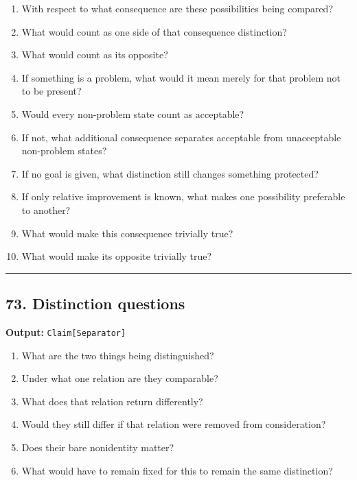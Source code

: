 \documentclass[
]{article}
\providecommand{\tightlist}{%
  \setlength{\itemsep}{0pt}\setlength{\parskip}{0pt}}
\begin{document}
\begin{enumerate}
\def\labelenumi{\arabic{enumi}.}
\tightlist
\item
  With respect to what consequence are these possibilities being
  compared?
\item
  What would count as one side of that consequence distinction?
\item
  What would count as its opposite?
\item
  If something is a problem, what would it mean merely for that problem
  not to be present?
\item
  Would every non-problem state count as acceptable?
\item
  If not, what additional consequence separates acceptable from
  unacceptable non-problem states?
\item
  If no goal is given, what distinction still changes something
  protected?
\item
  If only relative improvement is known, what makes one possibility
  preferable to another?
\item
  What would make this consequence trivially true?
\item
  What would make its opposite trivially true?
\end{enumerate}

\begin{center}\rule{0.5\linewidth}{0.5pt}\end{center}

\subsection{73. Distinction questions}\label{distinction-questions}

\textbf{Output:} \texttt{Claim{[}Separator{]}}

\begin{enumerate}
\def\labelenumi{\arabic{enumi}.}
\tightlist
\item
  What are the two things being distinguished?
\item
  Under what one relation are they comparable?
\item
  What does that relation return differently?
\item
  Would they still differ if that relation were removed from
  consideration?
\item
  Does their bare nonidentity matter?
\item
  What would have to remain fixed for this to remain the same
  distinction?
\end{enumerate}
\end{document}
